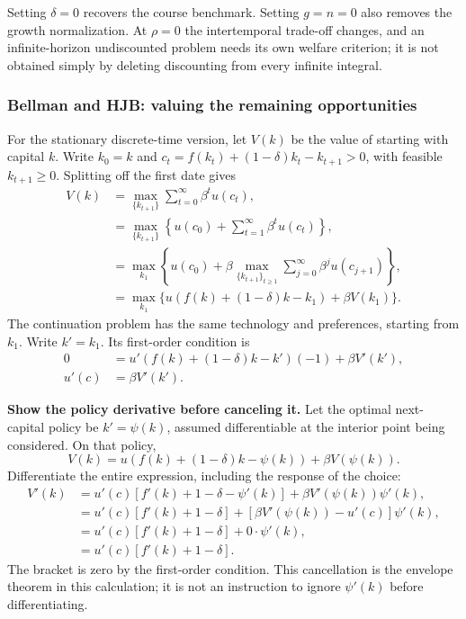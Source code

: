 Setting $\delta=0$ recovers the course benchmark. Setting $g=n=0$ also removes
the growth normalization. At $\rho=0$ the intertemporal trade-off changes, and
an infinite-horizon undiscounted problem needs its own welfare criterion; it is
not obtained simply by deleting discounting from every infinite integral.

\subsubsection{Bellman and HJB: valuing the remaining opportunities}\label{method-of-bellman-equation-dynamic-programming}

For the stationary discrete-time version, let $V(k)$ be the value of starting
with capital $k$. Write $k_0=k$ and
$c_t=f(k_t)+(1-\delta)k_t-k_{t+1}>0$, with feasible $k_{t+1}\geq0$.
Splitting off the first date gives
\begin{align}
V(k)
 &=\max_{\{k_{t+1}\}}\sum_{t=0}^{\infty}\beta^tu(c_t),\\
 &=\max_{\{k_{t+1}\}}
    \left\{u(c_0)+\sum_{t=1}^{\infty}\beta^tu(c_t)\right\},\\
 &=\max_{k_1}\left\{u(c_0)+\beta
       \max_{\{k_{t+1}\}_{t\geq1}}
        \sum_{j=0}^{\infty}\beta^ju(c_{j+1})\right\},\\
 &=\max_{k_1}\{u(f(k)+(1-\delta)k-k_1)+\beta V(k_1)\}.
\end{align}
The continuation problem has the same technology and preferences, starting
from $k_1$. Write $k'=k_1$. Its first-order condition is
\begin{align}
0&=u'(f(k)+(1-\delta)k-k')(-1)+\beta V'(k'),\\
u'(c)&=\beta V'(k').
\end{align}

\textbf{Show the policy derivative before canceling it.}
Let the optimal next-capital policy be $k'=\psi(k)$, assumed differentiable
at the interior point being considered. On that policy,
\[
V(k)=u(f(k)+(1-\delta)k-\psi(k))+\beta V(\psi(k)).
\]
Differentiate the entire expression, including the response of the choice:
\begin{align}
V'(k)
 &=u'(c)[f'(k)+1-\delta-\psi'(k)]
      +\beta V'(\psi(k))\psi'(k),\\
 &=u'(c)[f'(k)+1-\delta]
   +[\beta V'(\psi(k))-u'(c)]\psi'(k),\\
 &=u'(c)[f'(k)+1-\delta]+0\cdot\psi'(k),\\
 &=u'(c)[f'(k)+1-\delta].
\end{align}
The bracket is zero by the first-order condition. This cancellation is the
envelope theorem in this calculation; it is not an instruction to ignore
$\psi'(k)$ before differentiating.

